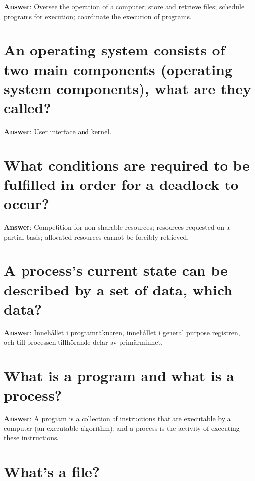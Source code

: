 \documentclass[a4paper,11pt,oneside]{book}
\begin{document}
\begin{sloppypar}
\textbf{Answer}: Oversee the operation of a computer; store and retrieve files; schedule programs for execution; coordinate the execution of programs.



\section{An operating system consists of two main components (operating system components), what are they called?}

\label{q:118:sa:en:True}

\textbf{Answer}: User interface and kernel.



\section{What conditions are required to be fulfilled in order for a deadlock to occur?}

\label{q:119:sa:en:True}

\textbf{Answer}: Competition for non-sharable resources; resources requested on a partial basis; allocated resources cannot be forcibly retrieved.



\section{A process's current state can be described by a set of data, which data?}

\label{q:120:sa:en:True}

\textbf{Answer}: Inneh\r{a}llet i programr\"aknaren, inneh\r{a}llet i general purpose registren, och till processen tillh\"orande delar av prim\"arminnet.



\section{What is a program and what is a process?}

\label{q:121:sa:en:True}

\textbf{Answer}: A program is a collection of instructions that are executable by a computer (an executable algorithm), and a process is the activity of executing these instructions.



\section{What's a file?}


\end{sloppypar}
\end{document}
